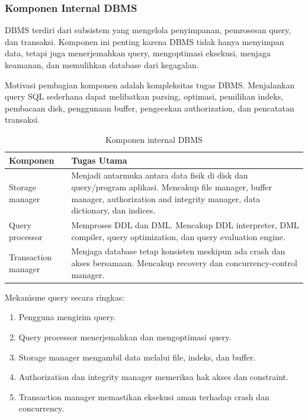 \subsubsection{Komponen Internal DBMS}

\begin{jawab}
DBMS terdiri dari subsistem yang mengelola penyimpanan, pemrosesan query, dan transaksi. Komponen ini penting karena DBMS tidak hanya menyimpan data, tetapi juga menerjemahkan query, mengoptimasi eksekusi, menjaga keamanan, dan memulihkan database dari kegagalan.
\end{jawab}

Motivasi pembagian komponen adalah kompleksitas tugas DBMS. Menjalankan query SQL sederhana dapat melibatkan parsing, optimasi, pemilihan indeks, pembacaan disk, penggunaan buffer, pengecekan authorization, dan pencatatan transaksi.

\begin{table}[H]
\centering
\begin{tabularx}{\textwidth}{|L{0.24\textwidth}|X|}
\hline
\textbf{Komponen} & \textbf{Tugas Utama} \\
\hline
Storage manager & Menjadi antarmuka antara data fisik di disk dan query/program aplikasi. Mencakup file manager, buffer manager, authorization and integrity manager, data dictionary, dan indices. \\
\hline
Query processor & Memproses DDL dan DML. Mencakup DDL interpreter, DML compiler, query optimization, dan query evaluation engine. \\
\hline
Transaction manager & Menjaga database tetap konsisten meskipun ada crash dan akses bersamaan. Mencakup recovery dan concurrency-control manager. \\
\hline
\end{tabularx}
\caption{Komponen internal DBMS}
\label{tab:dbms-components}
\end{table}

Mekanisme query secara ringkas:
\begin{enumerate}
    \item Pengguna mengirim query.
    \item Query processor menerjemahkan dan mengoptimasi query.
    \item Storage manager mengambil data melalui file, indeks, dan buffer.
    \item Authorization dan integrity manager memeriksa hak akses dan constraint.
    \item Transaction manager memastikan eksekusi aman terhadap crash dan concurrency.
\end{enumerate}


